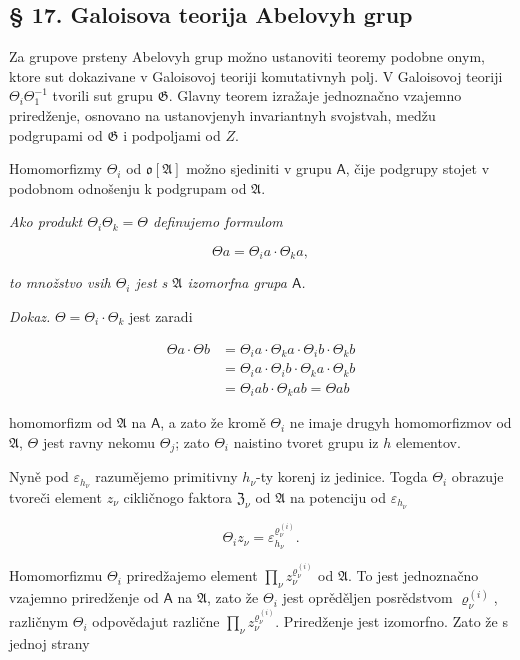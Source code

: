 \documentclass[11pt]{article}
\begin{document}
\subsection*{§ 17. Galoisova teorija Abelovyh grup}\label{die-galoissche-theorie-abelscher-gruppen}

Za grupove prsteny Abelovyh grup možno ustanoviti teoremy podobne onym, ktore sut dokazivane v Galoisovoj teoriji komutativnyh polj. V Galoisovoj teoriji \(\Theta_i\Theta_1^{-1}\) tvorili sut grupu \(\mathfrak{G}\). Glavny teorem izražaje jednoznačno vzajemno priredženje, osnovano na ustanovjenyh invariantnyh svojstvah, medžu podgrupami od \(\mathfrak{G}\) i podpoljami od \(Z\).

Homomorfizmy \(\Theta_i\) od \(\mathfrak{o}[\mathfrak{A}]\) možno sjediniti v grupu \(\mathsf A\), čije podgrupy stojet v podobnom odnošenju k podgrupam od \(\mathfrak{A}\).

\emph{Ako produkt \(\Theta_i \Theta_k = \Theta\) definujemo formulom}

\[\Theta a = \Theta_i a \cdot \Theta_k a,\]

\emph{to množstvo vsih \(\Theta_i\) jest s \(\mathfrak A\) izomorfna grupa \(\mathsf A\).}

\emph{Dokaz.} \(\Theta = \Theta_i \cdot \Theta_k\) jest zaradi

\[\begin{aligned}
\Theta a \cdot \Theta b &= \Theta_i a \cdot \Theta_k a \cdot \Theta_i b \cdot \Theta_k b \\
&= \Theta_i a \cdot \Theta_i b \cdot \Theta_k a \cdot \Theta_k b \\
&= \Theta_i a b \cdot \Theta_k a b = \Theta a b
\end{aligned}\]

homomorfizm od \(\mathfrak A\) na \(\mathsf A\), a zato že kromě \(\Theta_i\) ne imaje drugyh homomorfizmov od \(\mathfrak A\), \(\Theta\) jest ravny nekomu \(\Theta_j\); zato \(\Theta_i\) naistino tvoret grupu iz \(h\) elementov.

Nyně pod \(\varepsilon_{h_\nu}\) razumějemo primitivny \(h_\nu\)-ty korenj iz jedinice. Togda \(\Theta_i\) obrazuje tvoreči element \(z_\nu\) cikličnogo faktora \(\mathfrak Z_\nu\) od \(\mathfrak A\) na potenciju od \(\varepsilon_{h_\nu}\)

\[
\Theta_i z_\nu=\varepsilon_{h_\nu}^{\varrho_\nu^{(i)}}.
\]

Homomorfizmu \(\Theta_i\) priredžajemo element \(\prod_\nu z_\nu^{\varrho_\nu^{(i)}}\) od \(\mathfrak A\). To jest jednoznačno vzajemno priredženje od \(\mathsf A\) na \(\mathfrak A\), zato že \(\Theta_i\) jest oprěděljen posrědstvom \(\varrho_\nu^{(i)}\), različnym \(\Theta_i\) odpovědajut različne \(\prod_\nu z_\nu^{\varrho_\nu^{(i)}}\). Priredženje jest izomorfno. Zato že s jednoj strany
\end{document}
